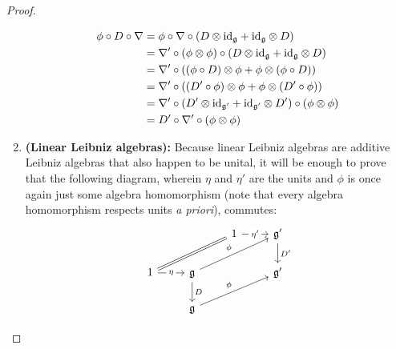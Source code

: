 \begin{proof}
\begin{enumerate}
$$\begin{aligned}
                                        \phi \circ D \circ \nabla & = \phi \circ \nabla \circ \left(D \tensor \id_{\g} + \id_{\g} \tensor D\right)
                                        \\
                                        & = \nabla' \circ (\phi \tensor \phi) \circ \left(D \tensor \id_{\g} + \id_{\g} \tensor D\right)
                                        \\
                                        & = \nabla' \circ \left((\phi \circ D) \tensor \phi + \phi \tensor (\phi \circ D)\right)
                                        \\
                                        & = \nabla' \circ \left((D' \circ \phi) \tensor \phi + \phi \tensor (D' \circ \phi)\right)
                                        \\
                                        & = \nabla' \circ \left(D' \tensor \id_{\g'} + \id_{\g'} \tensor D'\right) \circ (\phi \tensor \phi)
                                        \\
                                        & = D' \circ \nabla' \circ (\phi \tensor \phi)
                                    \end{aligned}
                                $$
                            \item \textbf{(Linear Leibniz algebras):} Because linear Leibniz algebras are additive Leibniz algebras that also happen to be unital, it will be enough to prove that the following diagram, wherein $\eta$ and $\eta'$ are the units and $\phi$ is once again just some algebra homomorphism (note that every algebra homomorphism respects units \textit{a priori}), commutes:
                                $$
                                    \begin{tikzcd}
                                    	&& {1} & {\g'} \\
                                    	{1} & {\g} && {\g'} \\
                                    	& {\g}
                                    	\arrow["{\phi}", from=2-2, to=1-4]
                                    	\arrow["{\phi}", from=3-2, to=2-4]
                                    	\arrow["{\eta}" description, from=2-1, to=2-2]
                                    	\arrow["{D}", from=2-2, to=3-2]
                                    	\arrow["{D'}", from=1-4, to=2-4]
                                    	\arrow["{\eta'}" description, from=1-3, to=1-4]
                                    	\arrow[Rightarrow, from=2-1, to=1-3, no head]

\end{tikzcd}$$
\end{enumerate}
\end{proof}
